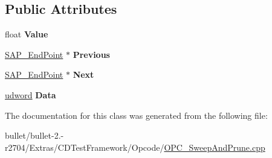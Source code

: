 \subsection*{Public Attributes}
\begin{DoxyCompactItemize}
\item 
\hypertarget{class_opcode_1_1_s_a_p___end_point_aaf2efa4eaf701b0cd14ce72501782e90}{float {\bfseries Value}}\label{class_opcode_1_1_s_a_p___end_point_aaf2efa4eaf701b0cd14ce72501782e90}

\item 
\hypertarget{class_opcode_1_1_s_a_p___end_point_a94efd616f64d1b4753d4eba43186c652}{\hyperlink{class_opcode_1_1_s_a_p___end_point}{S\+A\+P\+\_\+\+End\+Point} $\ast$ {\bfseries Previous}}\label{class_opcode_1_1_s_a_p___end_point_a94efd616f64d1b4753d4eba43186c652}

\item 
\hypertarget{class_opcode_1_1_s_a_p___end_point_ab43dbb475578c2d3170d94d35e694b4f}{\hyperlink{class_opcode_1_1_s_a_p___end_point}{S\+A\+P\+\_\+\+End\+Point} $\ast$ {\bfseries Next}}\label{class_opcode_1_1_s_a_p___end_point_ab43dbb475578c2d3170d94d35e694b4f}

\item 
\hypertarget{class_opcode_1_1_s_a_p___end_point_a1291861cb8e8a8b916e1722f3ac80d82}{\hyperlink{_ice_types_8h_a44c6f1920ba5551225fb534f9d1a1733}{udword} {\bfseries Data}}\label{class_opcode_1_1_s_a_p___end_point_a1291861cb8e8a8b916e1722f3ac80d82}

\end{DoxyCompactItemize}


The documentation for this class was generated from the following file\+:\begin{DoxyCompactItemize}
\item 
bullet/bullet-\/2.-\/r2704/\+Extras/\+C\+D\+Test\+Framework/\+Opcode/\hyperlink{_o_p_c___sweep_and_prune_8cpp}{O\+P\+C\+\_\+\+Sweep\+And\+Prune.\+cpp}\end{DoxyCompactItemize}
